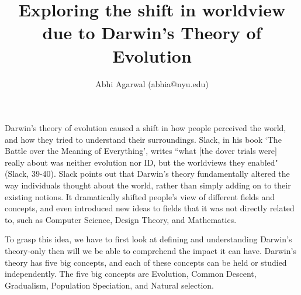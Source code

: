 \documentclass[11pt, oneside]{article}
\title{Exploring the shift in worldview due to Darwin's Theory of Evolution}
\author{Abhi Agarwal (abhia@nyu.edu)}
\date{}
\begin{document}
\maketitle



\par Darwin's theory of evolution caused a shift in how people perceived the world, and how they tried to understand their surroundings. Slack, in his book `The Battle over the Meaning of Everything', writes ``what [the dover trials were] really about was neither evolution nor ID, but the worldviews they enabled" (Slack, 39-40). Slack points out that Darwin's theory fundamentally altered the way individuals thought about the world, rather than simply adding on to their existing notions. It dramatically shifted people's view of different fields and concepts, and even introduced new ideas to fields that it was not directly related to, such as Computer Science, Design Theory, and Mathematics. 


\par To grasp this idea, we have to first look at defining and understanding Darwin's theory-only then will we be able to comprehend the impact it can have. Darwin's theory has five big concepts, and each of these concepts can be held or studied independently. The five big concepts are Evolution, Common Descent, Gradualism, Population Speciation, and Natural selection. 
\end{document}
